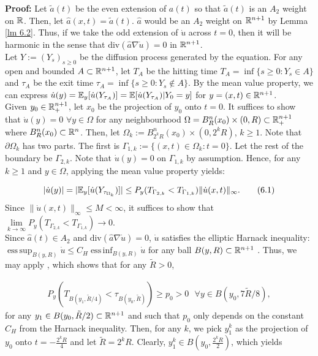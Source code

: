 \documentclass{article}
\DeclareMathOperator*{\esssup}{ess\,sup}
\DeclareMathOperator*{\essinf}{ess\, inf}
\begin{document}
\noindent
\textbf{Proof: } 
Let $\tilde{a}(t)$ be the even extension of $a(t)$ so that $\tilde{a}(t)$ is an $A_2$ weight on $\mathbb{R}$. Then, let $\hat{a}(x,t)=\tilde{a}(t)$. $\hat{a}$ would be an $A_2$ weight on $\mathbb{R}^{n+1}$ by Lemma \ref{lm 6.2}. Thus, if we take the odd extension of $\dot{u}$ across $t=0$, then it will be harmonic in the sense that $\textrm{div}(\hat{a}\nabla \dot{u}) = 0$ in $\mathbb{R}^{n+1}$. \\

Let $Y := (Y_s)_{s \ge 0}$ be the diffusion process generated by the equation. For any open and bounded $A \subset \mathbb{R}^{n+1}$, let $T_A$ be the hitting time $T_A= \inf \{s \ge 0: Y_s \in A\}$ and $\tau_A$ be the exit time $\tau_A= \inf \{s \ge 0: Y_s \not \in A\}$. By the mean value property, we can express $\dot{u}(y)=\mathbb{E}_y[\dot{u}(Y_{\tau_A})]=\mathbb{E}[\dot{u}(Y_{\tau_A})| Y_0=y]$ for $y=(x,t) \in \mathbb{R}^{n+1}$. \\

Given $y_0 \in \mathbb{R}^{n+1}_+$, let $x_0$ be the projection of $y_0$ onto $t=0$. It suffices to show that $\dot{u}(y)=0$ $\forall y \in \Omega$ for any neighbourhood $\Omega = B_{R}^n(x_0) \times (0, R) \subset \mathbb{R}^{n+1}_+$ where $B_{R}^n(x_0) \subset \mathbb{R}^n$. Then, let $\Omega_{k} := B_{2^k R}^n(x_0) \times (0, 2^k R)$, $k \ge 1$. Note that $\partial \Omega_{k}$ has two parts. The first is $\Gamma_{1,k} := \{(x,t) \in \Omega_{k}: t=0\}$. Let the rest of the boundary be $\Gamma_{2,k}$. Note that $\dot{u}(y) = 0$ on $\Gamma_{1,k}$ by assumption. Hence, for any $k \ge 1$ and $y \in \Omega$, applying the mean value property yields:

\begin{align*}
    |\dot{u}(y)|=|\mathbb{E}_y[\dot{u}(Y_{\tau_{\Omega_k}})]| \le P_y(T_{\Gamma_{2,k}}<T_{\Gamma_{1,k}})\|\dot{u}(x,t)\|_\infty.
    \tag{6.1}\label{eq: 6.1}
\end{align*}
Since $\|\dot{u}(x,t)\|_\infty \le M <\infty$, it suffices to show that $\lim\limits_{k \to \infty}P_y(T_{\Gamma_{2,k}}<T_{\Gamma_{1,k}}) \to 0$.\\

Since $\hat{a}(t) \in A_2$ and $\textrm{div}(\hat{a}\nabla \dot{u}) = 0$, $\dot{u}$ satisfies the elliptic Harnack inequality: $\esssup_{B(y,R)} \dot{u} \le C_H \essinf_{B(y,R)} \dot{u}$ for any ball $B(y,R) \subset \mathbb{R}^{n+1}$ \cite[Lemma 2.3.5]{fabes}. Thus, we may apply  \cite[Lemma 3.7]{harnack}, which shows that for any $\tilde{R}>0$,

\begin{align*}
    P_y(T_{B(y_1, \tilde{R}/4)} < \tau_{B(y_0, \tilde{R})}) \ge p_0 > 0 \textrm{  }\forall y \in B(y_0, 7\tilde{R}/8),
    \tag{6.2}\label{eq: 6.2}
\end{align*}
for any $y_1 \in B(y_0, \tilde{R}/2) \subset \mathbb{R}^{n+1}$ and such that $p_0$ only depends on the constant $C_H$ from the Harnack inequality. Then, for any $k$, we pick $y_1^k$ as the projection of $y_0$ onto $t=-\frac{2^kR}{4}$ and let $\tilde{R}= 2^kR$. Clearly, $y_1^k \in B(y_0, \frac{2^kR}{2})$, which yields
\end{document}
